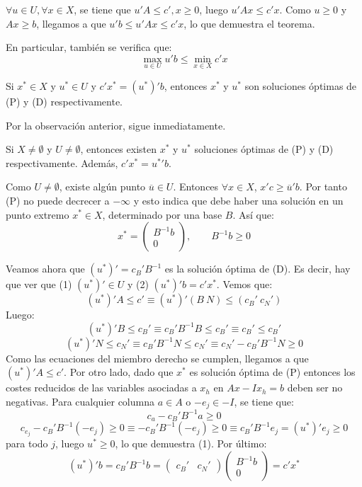 \documentclass[PM.tex]{subfiles}
\begin{document}
\begin{dem}
$\forall u \in U, \forall x \in X$, se tiene que $u'A ≤ c', x ≥ 0$, luego $u'A x ≤ c'x$. Como $u≥0$ y $Ax≥b$, llegamos a que $u'b ≤ u'Ax ≤ c'x$, lo que demuestra el teorema.
\end{dem}

\begin{obser}
En particular, también se verifica que:
\[ \max\limits_{u \in U} u'b ≤ \min\limits_{x\in X} c'x \]
\end{obser}

\begin{coro}
Si $x^* \in X$ y $u^* \in U$ y $c'x^* = (u^*)'b$, entonces $x^*$ y $u^*$ son soluciones óptimas de (P) y (D) respectivamente.
\end{coro}

\begin{dem}
Por la observación anterior, sigue inmediatamente.
\end{dem}

\begin{theorem}
Si $X \neq \emptyset$ y $U \neq \emptyset$, entonces existen $x^*$ y $u^*$ soluciones óptimas de (P) y (D) respectivamente. Además, $c'x^* = {u^*}'b$.
\end{theorem}

\begin{dem}
Como $U \neq \emptyset$, existe algún punto $\overline{u} \in U$. Entonces $\forall x \in X$, $x'c ≥ \overline{u}'b$. Por tanto (P) no puede decrecer a $-\infty$ y esto indica que debe haber una solución en un punto extremo $x^* \in X$, determinado por una base $B$. Así que:
\[ x^* = \begin{pmatrix}B^{-1} b \\ 0\end{pmatrix}, \qquad B^{-1}b ≥ 0 \]

Veamos ahora que $(u^*)' = c_B'B^{-1}$ es la solución óptima de (D). Es decir, hay que ver que (1) $(u^*)' \in U$ y (2) $(u^*)'b = c'x^*$. Vemos que:
\[ (u^*)'A ≤ c' \equiv (u^*)' (B \ N) ≤ (c_B' \ c_N') \]
Luego:
\[ (u^*)'B ≤ c_B' \equiv c_B'B^{-1}B ≤ c_B' \equiv c_B' ≤ c_B'\]
\[ (u^*)'N ≤ c_N' \equiv c_B'B^{-1}N ≤ c_N' \equiv c_N' - c_B'B^{-1}N ≥ 0\]
Como las ecuaciones del miembro derecho se cumplen, llegamos a que $(u^*)'A ≤ c'$. Por otro lado, dado que $x^*$ es solución óptima de (P) entonces los costes reducidos de las variables asociadas a $x_h$ en $Ax - I x_h = b$ deben ser no negativas. Para cualquier columna $a \in A$ o $-e_j \in -I$, se tiene que:
\[ c_a - c_B' B^{-1} a ≥ 0 \]
\[ c_{e_j} - c_B' B^{-1}(-e_j) ≥ 0 \equiv  -c_B'B^{-1}(-e_j) ≥ 0 \equiv c_B'B^{-1}e_j = (u^*)'e_j ≥ 0 \]
para todo $j$, luego $u^* ≥ 0$, lo que demuestra (1). Por último:
\[ (u^*)'b = c_B'B^{-1}b = \begin{pmatrix}c_B' & c_N'\end{pmatrix}\begin{pmatrix}B^{-1}b\\0\end{pmatrix} = c'x^* \]
\end{dem}
\end{document}
